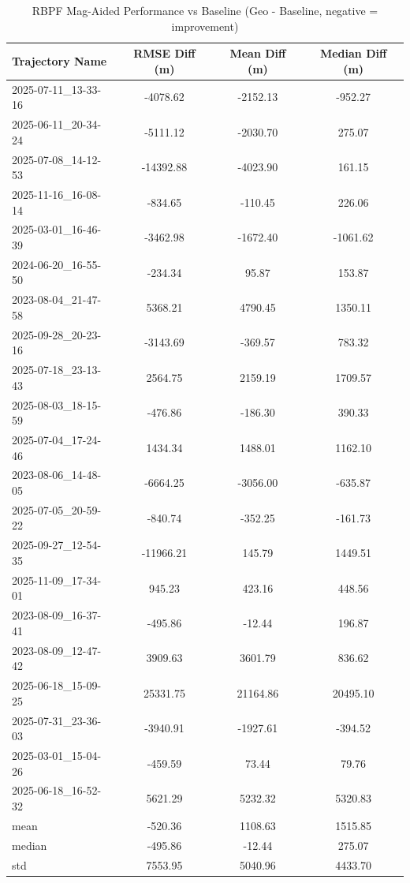 \begin{table}[h]
    \centering
    \caption{RBPF Mag-Aided Performance vs Baseline (Geo - Baseline, negative = improvement)}
    \begin{tabular}{ || l || c c c || }
    \toprule
    Trajectory Name & RMSE Diff (m) & Mean Diff (m) & Median Diff (m) \\
    \midrule
    2025-07-11\_13-33-16 & -4078.62 & -2152.13 & -952.27 \\
    2025-06-11\_20-34-24 & -5111.12 & -2030.70 & 275.07 \\
    2025-07-08\_14-12-53 & -14392.88 & -4023.90 & 161.15 \\
    2025-11-16\_16-08-14 & -834.65 & -110.45 & 226.06 \\
    2025-03-01\_16-46-39 & -3462.98 & -1672.40 & -1061.62 \\
    2024-06-20\_16-55-50 & -234.34 & 95.87 & 153.87 \\
    2023-08-04\_21-47-58 & 5368.21 & 4790.45 & 1350.11 \\
    2025-09-28\_20-23-16 & -3143.69 & -369.57 & 783.32 \\
    2025-07-18\_23-13-43 & 2564.75 & 2159.19 & 1709.57 \\
    2025-08-03\_18-15-59 & -476.86 & -186.30 & 390.33 \\
    2025-07-04\_17-24-46 & 1434.34 & 1488.01 & 1162.10 \\
    2023-08-06\_14-48-05 & -6664.25 & -3056.00 & -635.87 \\
    2025-07-05\_20-59-22 & -840.74 & -352.25 & -161.73 \\
    2025-09-27\_12-54-35 & -11966.21 & 145.79 & 1449.51 \\
    2025-11-09\_17-34-01 & 945.23 & 423.16 & 448.56 \\
    2023-08-09\_16-37-41 & -495.86 & -12.44 & 196.87 \\
    2023-08-09\_12-47-42 & 3909.63 & 3601.79 & 836.62 \\
    2025-06-18\_15-09-25 & 25331.75 & 21164.86 & 20495.10 \\
    2025-07-31\_23-36-03 & -3940.91 & -1927.61 & -394.52 \\
    2025-03-01\_15-04-26 & -459.59 & 73.44 & 79.76 \\
    2025-06-18\_16-52-32 & 5621.29 & 5232.32 & 5320.83 \\
    \midrule
    mean & -520.36 & 1108.63 & 1515.85 \\
    median & -495.86 & -12.44 & 275.07 \\
    std & 7553.95 & 5040.96 & 4433.70 \\
    \bottomrule
    \end{tabular}
    \label{tab:rbpf_mag_results}
\end{table}